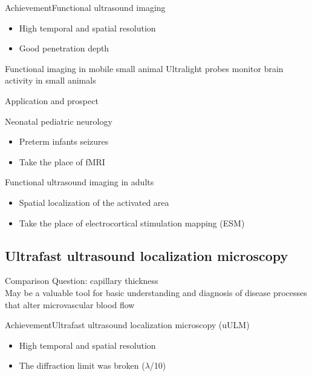 \documentclass{beamer}
\begin{document}
\begin{frame}{Achievement}{Functional ultrasound imaging}
 \begin{itemize}
	\item {
		High temporal and spatial resolution
	}
	\vspace{1cm}
	\item{
	Good penetration depth
}
\end{itemize}
\end{frame}
\begin{frame}{Functional imaging in mobile small animal}
\vspace{0.7cm}
Ultralight probes monitor brain activity in small animals
\end{frame}

\begin{frame}{Application and prospect}
\begin{block}{Neonatal pediatric neurology}
\begin{itemize}
	\item {
	Preterm infants seizures
}
\item{
Take the place of fMRI
}
\end{itemize}
\end{block}
\pause
\begin{block}{Functional ultrasound imaging in adults}
\begin{itemize}
	\item {
	Spatial localization of the activated area
}
\item{
Take the place of electrocortical stimulation mapping (ESM)}
\end{itemize}
\end{block}
\end{frame}
\subsection{Ultrafast ultrasound localization microscopy}
\begin{frame}{Comparison}
\alert{Question: capillary thickness}\\
\vspace{0.5cm}
May be a valuable tool for basic understanding and diagnosis of disease processes that alter microvascular blood flow
\end{frame}
\begin{frame}{Achievement}{Ultrafast ultrasound localization microscopy (uULM)}
\begin{itemize}
	\item {
High temporal and spatial resolution	
}
\vspace{1cm}
\item{
	The diffraction limit was broken ($\lambda$/10)
}
\end{itemize}
\end{frame}
\end{document}
